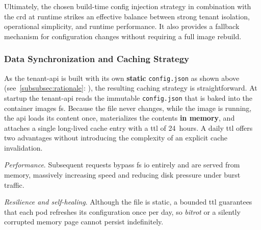 \documentclass[11pt, a4paper, oneside, listof=totoc]{scrartcl}
\newcommand{\see}[1]{(see~\autoref{#1}: \textit{\nameref{#1}})}
\begin{document}
                Ultimately, the chosen build-time config injection strategy in combination with the
                \gls{crd} at runtime strikes an effective balance between strong tenant isolation,
                operational simplicity, and runtime performance.
                It also provides a fallback mechanism for configuration changes without requiring
                a full image rebuild.

    \clearpage

            \subsubsection{Data Synchronization and Caching Strategy}\label{syncAndCache}
                As the tenant-\gls{api} is built with its own \textbf{static} \texttt{config.json}
                as shown above \see{subsubsec:rationale}, the resulting caching strategy is
                straightforward.
                At startup the tenant-\gls{api} reads the immutable \texttt{config.json} that is
                baked into the container images \gls{fs}.
                Because the file never changes, while the image is running, the \gls{api} loads its
                content once, materializes the contents \textbf{in memory}, and attaches a single
                long-lived cache entry with a \gls{ttl} of 24~hours.
                A daily \gls{ttl} offers two advantages without introducing the complexity of an
                explicit cache invalidation.
                
                \begin{enumerate}[label={[\arabic*]:},
                    ref=Challenge~\arabic*,
                    leftmargin=*,
                    itemsep=0.6\baselineskip]

                    \item\label{chal:cachePerformance}
                        \textit{Performance}.
                        Subsequent requests bypass \gls{fs} \gls{io} entirely and are served from
                        memory, massively increasing speed and reducing disk pressure under burst
                        traffic.

                    \item\label{chal:cacheResilience}
                        \textit{Resilience and self-healing}.
                        Although the file is static, a bounded \gls{ttl} guarantees that each pod
                        refreshes its configuration once per day, so \textit{\gls{bitrot}} or a
                        silently corrupted memory page cannot persist indefinitely.
                        
                \end{enumerate}
\end{document}
